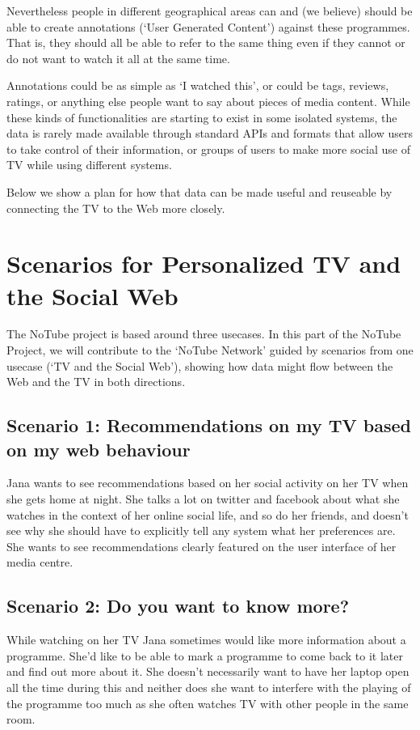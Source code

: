 \documentclass[]{article}%
\begin{document}
Nevertheless people in different geographical areas can and (we believe) should be able to create annotations (`User Generated Content') against these programmes. That is, they should all be able to refer to the same thing even if they cannot or do not want to watch it all at the same time. 

Annotations could be as simple as `I watched this', or could be tags, reviews, ratings, or anything else people want to say about pieces of media content. While these kinds of functionalities are starting to exist in some isolated systems, the data is rarely made available through standard APIs and formats that allow users to take control of their information, or groups of users to make more social use of TV while using different systems.

Below we show a plan for how that data can be made useful and reuseable by connecting the TV to the Web more closely.

\section*{Scenarios for Personalized TV and the Social Web} %

The NoTube project is based around three usecases. In this part of the NoTube Project, we will contribute to the `NoTube Network' guided by scenarios from one usecase (`TV and the Social Web'), showing how data might flow between the Web and the TV in both directions.

\subsection{Scenario 1: Recommendations on my TV based on my web behaviour}

Jana wants to see recommendations based on her social activity on her TV when she gets 
home at night. She talks a lot on twitter and facebook about what she watches in the context 
of her online social life, and so do her friends, and doesn't see why she should have to 
explicitly tell any system what her preferences are. She wants to see recommendations clearly 
featured on the user interface of her media centre. 

\subsection{Scenario 2: Do you want to know more?}

While watching on her TV Jana sometimes would like more information about a programme. 
She'd like to be able to mark a programme to come back to it later and find out more 
about it. She doesn't necessarily want to have her laptop open all the time during this and 
neither does she want to interfere with the playing of the programme too much as she often 
watches TV with other people in the same room. 
\end{document}
